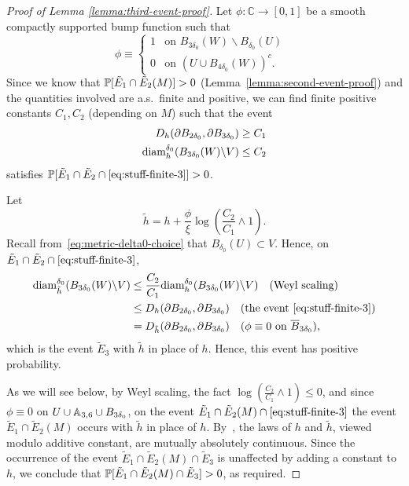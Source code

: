 \documentclass[12pt]{amsart}
\numberwithin{equation}{section}
\begin{document}
	
	\begin{proof}[Proof of Lemma \ref{lemma:third-event-proof}]
		Let $\phi : \mathbb C\to [0,1]$ be a smooth compactly supported bump function such that
		\[
		\phi \equiv \begin{cases}
		1 &\mbox{on $B_{3 \delta_0}(W) \backslash B_{\delta_0}(U)$  } \\
		0 &\mbox{on $(U \cup B_{4 \delta_0}(W))^c$}.
		\end{cases}
		\]
		Since we know that $\P[\tilde E_1\cap \tilde E_2(M)] > 0$ (Lemma~\ref{lemma:second-event-proof}) and the quantities involved are a.s.\ finite and positive, we can find finite positive constants $C_1, C_2$ (depending on $M$) such that the event
		\begin{equation} \label{eq:stuff-finite-3}
		\begin{aligned}
		D_h(\partial B_{2 \delta_0}, \partial B_{3 \delta_0}) &\geq C_1 \\
		\diam^{\delta_0}_h(B_{3 \delta_0}(W) \backslash V) &\leq C_2
		\end{aligned}
		\end{equation}
		satisfies	$\P[\tilde E_1 \cap \tilde E_2 \cap \eqref{eq:stuff-finite-3}] > 0$.
		
		Let 
		\begin{equation}
		\tilde h = h + \frac{\phi}{\xi} \log(\frac{C_2}{C_1} \wedge 1) .
		\end{equation}
		Recall from~\eqref{eq:metric-delta0-choice} that $B_{\delta_0}(U) \subset V$. Hence, on $\tilde E_1 \cap \tilde E_2 \cap \eqref{eq:stuff-finite-3}$,
		\begin{align*}
		\diam^{\delta_0}_{\tilde h}(B_{3 \delta_0}(W) \backslash V) &\leq \frac{C_2}{C_1} \diam^{\delta_0}_{h}(B_{3 \delta_0}(W) \backslash V) \quad \mbox{(Weyl scaling)} \\
		&\leq D_h(\partial B_{2 \delta_0}, \partial B_{3\delta_0}) \quad \mbox{(the event \eqref{eq:stuff-finite-3})} \\
		&= D_{\tilde h}(\partial B_{2 \delta_0}, \partial B_{3\delta_0}) \quad \mbox{($\phi \equiv 0$ on $\overline B_{3 \delta_0}$)},
		\end{align*}
		which is the event $\tilde E_3$ with $\tilde h$ in place of $h$. Hence, this event has positive probability.
		
		As we will see below, by Weyl scaling,  the fact $\log(\frac{C_2}{C_1} \wedge 1) \leq 0$, and since $\phi \equiv 0$ on $U \cup \A_{3,6} \cup B_{3 \delta_0}$,
		on the event $\tilde E_1 \cap \tilde E_2(M) \cap \eqref{eq:stuff-finite-3}$ the event $\tilde E_1 \cap \tilde E_2(M)$ occurs with $\tilde h$ in place of $h$. By~\cite[Proposition 2.9]{miller2017imaginary}, the laws of $h$ and $\tilde h$, viewed modulo additive constant, are mutually absolutely continuous. Since the occurrence of the event $\tilde E_1 \cap \tilde E_2(M) \cap \tilde E_3$ is unaffected by adding a constant to $h$, we conclude that $\P[\tilde E_1\cap \tilde E_2(M) \cap \tilde E_3] > 0$, as required. 
		

\end{proof}
\end{document}
